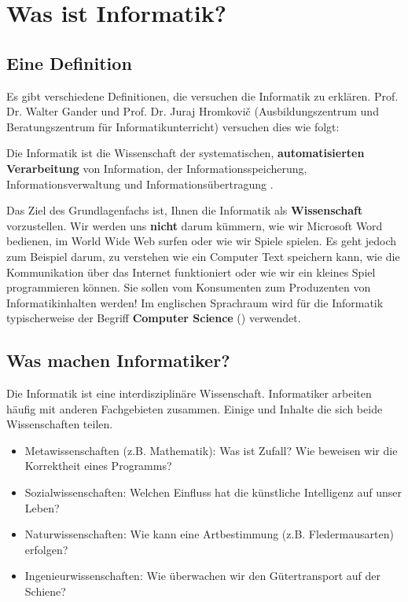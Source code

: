 
\toggletrue{image}
\togglefalse{imagehover}

\chapter{Was ist Informatik?}
\label{chapter-was-ist-informatik}

\section{Eine Definition}

Es gibt verschiedene Definitionen, die versuchen die Informatik zu erklären. Prof. Dr. Walter Gander und Prof. Dr. Juraj Hromkovič (Ausbildungszentrum und Beratungszentrum für Informatikunterricht) versuchen
dies wie folgt:

\begin{definition}[Informatik]
Die Informatik ist die Wissenschaft der systematischen, \textbf{automatisierten Verarbeitung} von Information, der Informationsspeicherung, Informationsverwaltung und Informationsübertragung \cite{def-informatik}.
\end{definition}

Das Ziel des Grundlagenfachs ist, Ihnen die Informatik als \textbf{Wissenschaft} vorzustellen. Wir werden uns \textbf{nicht} darum kümmern, wie wir Microsoft Word bedienen, im World Wide Web surfen oder wie wir Spiele spielen. Es geht jedoch zum Beispiel darum, zu verstehen wie ein Computer Text speichern kann, wie die Kommunikation über das Internet funktioniert oder wie wir ein kleines Spiel programmieren können. Sie sollen vom Konsumenten zum Produzenten von Informatikinhalten werden! Im englischen Sprachraum wird für die Informatik typischerweise der Begriff \textbf{Computer Science} () verwendet.

\section{Was machen Informatiker?}

Die Informatik ist eine interdisziplinäre Wissenschaft. Informatiker arbeiten häufig mit anderen Fachgebieten zusammen. Einige  und Inhalte die sich beide Wissenschaften teilen.

\begin{itemize}
\item Metawissenschaften (z.B. Mathematik): Was ist Zufall? Wie beweisen wir die Korrektheit eines Programms?
\item Sozialwissenschaften: Welchen Einfluss hat die künstliche Intelligenz auf unser Leben?
\item Naturwissenschaften: Wie kann eine Artbestimmung (z.B. Fledermausarten) erfolgen?
\item Ingenieurwissenschaften: Wie überwachen wir den Gütertransport auf der Schiene?
\end{itemize}

